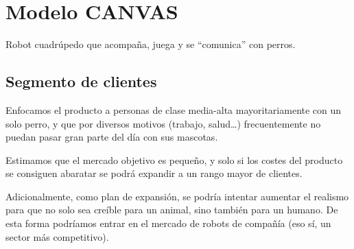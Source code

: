 \section{Modelo CANVAS}

Robot cuadrúpedo que acompaña, juega y se ``comunica'' con perros.

\begin{figure}[H]
    \centering
\end{figure}

\subsection{Segmento de clientes}


Enfocamos el producto a personas de clase media-alta mayoritariamente con un solo perro, y que por diversos motivos (trabajo, salud\dots) frecuentemente no puedan pasar gran parte del día con sus mascotas.

Estimamos que el mercado objetivo es pequeño, y solo si los costes del producto se consiguen abaratar se podrá expandir a un rango mayor de clientes.

\vspace{\baselineskip}

Adicionalmente, como plan de expansión, se podría intentar aumentar el realismo para que no solo sea creíble para un animal, sino también para un humano. De esta forma podríamos entrar en el mercado de robots de compañía (eso sí, un sector más competitivo).

